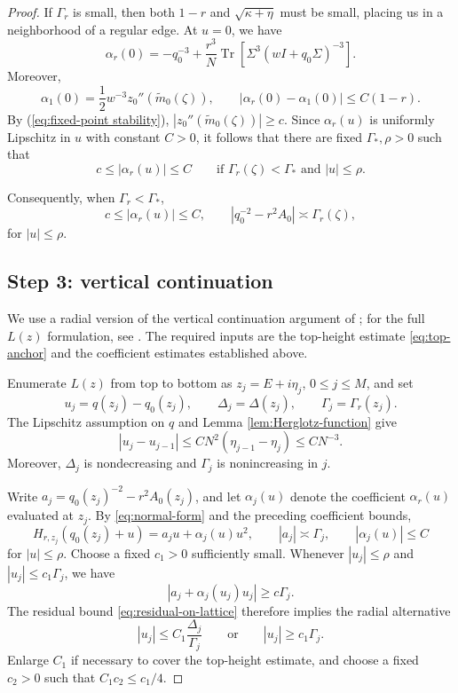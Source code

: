 \documentclass[11pt,reqno]{amsart}
\def\Tr{\operatorname{Tr}}
\theoremstyle{definition}
\numberwithin{equation}{section}
\numberwithin{figure}{section}
\begin{document}
\begin{proof}
If $\Gamma_r$ is small, then both $1-r$ and $\sqrt{\kappa+\eta}$ must be small, placing us in a neighborhood of a regular edge. At $u=0$, we have
\begin{equation}\label{eq:curvature}
 \alpha_r(0)
 =-q_0^{-3}
 +\frac{r^3}{N}\Tr\!\left[
 \Sigma^3(wI+q_0\Sigma)^{-3}
 \right].
\end{equation}
Moreover,
\[
 \alpha_1(0)
 =\frac12w^{-3}z_0''(\widetilde m_0(\zeta)),
 \qquad
 |\alpha_r(0)-\alpha_1(0)|\le C(1-r).
\]
By (\ref{eq:fixed-point stability}), $|z_0''(\widetilde m_0(\zeta))|\geq c$. Since $\alpha_r(u)$ is uniformly Lipschitz in $u$ with constant $C>0$, it follows that there are fixed
$\Gamma_*,\rho>0$ such that
\begin{equation}\label{eq:alpha-scale}
 c\le|\alpha_r(u)|\le C
 \qquad
 \text{if }\Gamma_r(\zeta)<\Gamma_*\text{ and }|u|\leq\rho.
\end{equation}

Consequently, when $\Gamma_r<\Gamma_*$,
\begin{equation}\label{eq:factorization}
    c\le|\alpha_r(u)|\le C,
 \qquad
 |q_0^{-2}-r^2A_0|\asymp\Gamma_r(\zeta),
\end{equation}
for $|u|\le\rho$.

\subsection*{Step 3: vertical continuation}
We use a radial version of the vertical continuation argument of
\cite[Definitions~5.4 and~A.2 and Lemma~A.5]{knowles2017anisotropic};
for the full $L(z)$ formulation, see
\cite[Definition~C.1 and Lemma~C.3(b), equations~(87)--(97)]
{fan2022tracy}.
The required inputs are the top-height estimate
\eqref{eq:top-anchor} and the coefficient estimates established above.

Enumerate $L(z)$ from top to bottom as
$z_j=E+i\eta_j$, $0\leq j\leq M$, and set
\[
    u_j=q(z_j)-q_0(z_j),\qquad
    \Delta_j=\Delta(z_j),\qquad
    \Gamma_j=\Gamma_r(z_j).
\]
The Lipschitz assumption on $q$ and Lemma
\ref{lem:Herglotz-function} give
\[
    |u_j-u_{j-1}|
    \leq CN^2(\eta_{j-1}-\eta_j)
    \leq CN^{-3}.
\]
Moreover, $\Delta_j$ is nondecreasing and $\Gamma_j$ is
nonincreasing in $j$.

Write $a_j=q_0(z_j)^{-2}-r^2A_0(z_j)$, and let $\alpha_j(u)$
denote the coefficient $\alpha_r(u)$ evaluated at $z_j$.
By \eqref{eq:normal-form} and the preceding coefficient bounds,
\[
    H_{r,z_j}(q_0(z_j)+u)=a_ju+\alpha_j(u)u^2,
    \qquad
    |a_j|\asymp\Gamma_j,\qquad
    |\alpha_j(u)|\leq C
\]
for $|u|\leq\rho$.
Choose a fixed $c_1>0$ sufficiently small.
Whenever $|u_j|\leq\rho$ and $|u_j|\leq c_1\Gamma_j$, we have
\[
    |a_j+\alpha_j(u_j)u_j|\geq c\Gamma_j.
\]
The residual bound \eqref{eq:residual-on-lattice} therefore
implies the radial alternative
\begin{equation}\label{eq:radial-alternative}
    |u_j|\leq C_1\frac{\Delta_j}{\Gamma_j}
    \qquad\text{or}\qquad
    |u_j|\geq c_1\Gamma_j.
\end{equation}
Enlarge $C_1$ if necessary to cover the top-height estimate,
and choose a fixed $c_2>0$ such that $C_1c_2\leq c_1/4$.


\end{proof}
\end{document}
